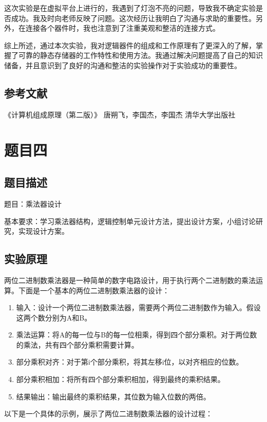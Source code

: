 \documentclass[UTF8,12pt]{article}
\begin{document}
这次实验是在虚拟平台上进行的，我遇到了灯泡不亮的问题，导致我不确定实验是否成功。我及时向老师反映了问题。这次经历让我明白了沟通与求助的重要性。另外，在连接各个器件时，我也注意到了注重美观和整洁的连接方式。

综上所述，通过本次实验，我对逻辑器件的组成和工作原理有了更深入的了解，掌握了可靠的静态存储器的工作特性和使用方法。我通过解决问题提高了自己的知识储备，并且意识到了良好的沟通和整洁的实验操作对于实验成功的重要性。

\subsection{参考文献}
《计算机组成原理（第二版）》  唐朔飞，李国杰，李国杰   清华大学出版社

\newpage

\section{题目四}
\subsection{题目描述}
题目：乘法器设计

基本要求：学习乘法器结构，逻辑控制单元设计方法，提出设计方案，小组讨论研究，实现设计方案。

\subsection{实验原理}
两位二进制数乘法器是一种简单的数字电路设计，用于执行两个二进制数的乘法运算。下面是一个基本的两位二进制数乘法器的设计：

\begin{enumerate}
    \item 输入：设计一个两位二进制数乘法器，需要两个两位二进制数作为输入。假设这两个数分别为A和B。
    \item 乘法运算：将A的每一位与B的每一位相乘，得到四个部分乘积。对于两位数的乘法，共有四个部分乘积需要计算。
    \item 部分乘积对齐：对于第i个部分乘积，将其左移i位，以对齐相应的位数。
    \item 部分乘积相加：将所有四个部分乘积相加，得到最终的乘积结果。
    \item 结果输出：输出最终的乘积结果，其位数为输入位数的两倍。
\end{enumerate}

以下是一个具体的示例，展示了两位二进制数乘法器的设计过程：
\end{document}
